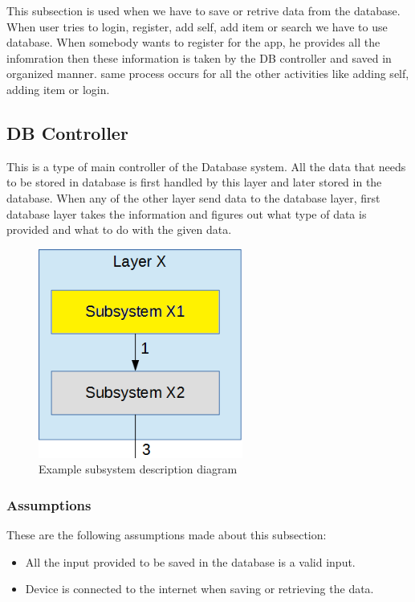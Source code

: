 This subsection is used when we have to save or retrive data from the database. When user tries to login, register, add self, add item or search we have to use database. When somebody wants to register for the app, he provides all the infomration then these information is taken by the DB controller and saved in organized manner. same process occurs for all the other activities like adding self, adding item or login.
\subsection{DB Controller}
This is a type of main controller of the Database system. All the data that needs to be stored in database is first handled by this layer and later stored in the database. When any of the other layer send data to the database layer, first database layer takes the information and figures out what type of data is provided and what to do with the given data.

\begin{figure}[h!]
	\centering
 	\includegraphics[width=0.60\textwidth]{images/subsystem}
 \caption{Example subsystem description diagram}
\end{figure}

\subsubsection{Assumptions}
These are the following assumptions made about this subsection:
\begin{itemize}
    \item All the input provided to be saved in the database is a valid input.
    \item Device is connected to the internet when saving or retrieving the data.
\end{itemize}


